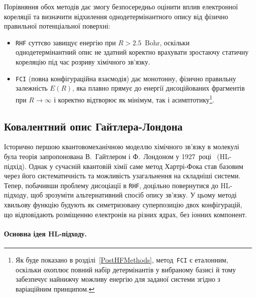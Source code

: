 Порівняння обох методів дає змогу безпосередньо оцінити вплив
електронної кореляції та визначити відхилення однодетермінантного
опису від фізично правильної потенціальної поверхні:
\begin{itemize}
	\item \texttt{RHF} суттєво завищує енергію при $R > 2.5$~Bohr,
	      оскільки однодетермінантний опис не здатний коректно врахувати
	      зростаючу статичну кореляцію під час розриву хімічного зв'язку.

	\item \texttt{FCI} (повна конфігураційна взаємодія) дає монотонну,
	      фізично правильну залежність $E(R)$, яка плавно прямує до енергії
	      дисоційованих фрагментів при $R \to \infty$ і коректно відтворює
	      як мінімум, так і асимптотику\footnote{Як буде показано в
		      розділі~\ref{PostHFMethods}, метод~\texttt{FCI} є еталонним,
		      оскільки охоплює повний набір детермінантів у вибраному базисі
		      й тому забезпечує найнижчу можливу енергію для заданої системи
		      згідно з варіаційним принципом.}.
\end{itemize}



\subsection{Ковалентний опис Гайтлера-Лондона}

Історично першою квантовомеханічною моделлю хімічного зв'язку
в молекулі  була теорія запропонована В.~Гайтлером і Ф.~Лондоном
у 1927~році~ (HL-підхід).
Однак у сучасній квантовій хімії саме метод Хартрі-Фока став
базовим через його систематичність та можливість узагальнення
на складніші системи. Тепер, побачивши проблему дисоціації в \texttt{RHF},
доцільно повернутися до HL-підходу, щоб зрозуміти альтернативний
спосіб опису зв'язку. У цьому методі хвильову функцію будують як
симетризовану суперпозицію двох конфігурацій, що відповідають
розміщенню електронів на різних ядрах, без іонних компонент.

\paragraph{Основна ідея HL-підходу.}

